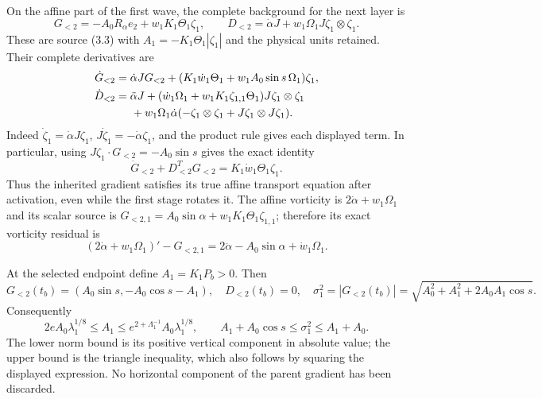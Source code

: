On the affine part of the first wave, the complete background for the
next layer is
\begin{equation}
 G_{<2}=-A_0R_\alpha e_2+w_1K_1\Theta_1\zeta_1,
 \qquad
 D_{<2}=\dot\alpha J+w_1\Omega_1J\zeta_1\otimes\zeta_1.
 \label{eq:cv-first-inherited}
\end{equation}
These are source (3.3) with $A_1=-K_1\Theta_1|\zeta_1|$
and the physical units retained. Their complete derivatives are
\begin{align}
 \dot G_{<2}&=\dot\alpha JG_{<2}
      +(K_1\dot w_1\Theta_1+w_1A_0\sin s\,\Omega_1)\zeta_1,
 \label{eq:cv-first-G-derivative}\\
 \dot D_{<2}&=\ddot\alpha J
  +(\dot w_1\Omega_1+w_1K_1\zeta_{1,1}\Theta_1)
                            J\zeta_1\otimes\zeta_1\nonumber\\
 &\hspace{5mm}+w_1\Omega_1\dot\alpha
       (-\zeta_1\otimes\zeta_1+J\zeta_1\otimes J\zeta_1).
 \label{eq:cv-first-D-derivative}
\end{align}
Indeed $\dot\zeta_1=\dot\alpha J\zeta_1$,
$J\dot\zeta_1=-\dot\alpha\zeta_1$, and the product rule gives
each displayed term. In particular, using
$J\zeta_1\cdot G_{<2}=-A_0\sin s$ gives the exact identity
\begin{equation}
 \dot G_{<2}+D_{<2}^TG_{<2}=K_1\dot w_1\Theta_1\zeta_1.
 \label{eq:cv-first-affine-scalar-residual}
\end{equation}
Thus the inherited gradient satisfies its true affine transport
equation after activation, even while the first stage rotates it.
The affine vorticity is $2\dot\alpha+w_1\Omega_1$ and its scalar
source is $G_{<2,1}=A_0\sin\alpha+w_1K_1\Theta_1\zeta_{1,1}$;
therefore its exact vorticity residual is
\begin{equation}
 (2\dot\alpha+w_1\Omega_1)'-G_{<2,1}
       =2\ddot\alpha-A_0\sin\alpha+\dot w_1\Omega_1.
 \label{eq:cv-first-affine-vorticity-residual}
\end{equation}

At the selected endpoint define $A_1=K_1P_b>0$. Then
\begin{equation}
 G_{<2}(t_b)=(A_0\sin s,-A_0\cos s-A_1),\quad D_{<2}(t_b)=0,
 \quad\sigma_1^2=|G_{<2}(t_b)|
   =\sqrt{A_0^2+A_1^2+2A_0A_1\cos s}.
 \label{eq:cv-first-exact-sigma}
\end{equation}
Consequently
\[
 2e A_0\lambda_1^{1/8}\leq A_1
 \leq e^{2+\Lambda_1^{-1}}A_0\lambda_1^{1/8},\qquad
 A_1+A_0\cos s\leq\sigma_1^2\leq A_1+A_0.
\]
The lower norm bound is its positive vertical component in absolute
value; the upper bound is the triangle inequality, which also follows
by squaring the displayed expression. No horizontal component of the
parent gradient has been discarded.


